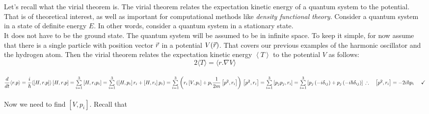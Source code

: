 \documentclass[fleqn]{article}
\begin{document}
\begin{enumerate}
\begin{enumerate}
      \textcolor{hwColor}{
        \\
        \\
        Let's recall what the vir­ial the­o­rem is. The vir­ial the­o­rem re­lates the ex­pec­ta­tion ki­netic en­ergy of a quan­tum sys­tem to the po­ten­tial. 
        That is of the­o­ret­i­cal in­ter­est, as well as im­por­tant for com­pu­ta­tional meth­ods like \emph{den­sity func­tional the­ory}.
        Con­sider a quan­tum sys­tem in a state of def­i­nite en­ergy $E$. In other words, con­sider a quan­tum sys­tem in a sta­tion­ary state. 
        \\
        It does not have to be the ground state. The quan­tum sys­tem will be as­sumed to be in in­fi­nite space. To keep it sim­ple, 
        for now as­sume that there is a sin­gle par­ti­cle with po­si­tion vec­tor ${\skew0\vec r}$ in a po­ten­tial $V({\skew0\vec r})$. 
        That cov­ers our pre­vi­ous ex­am­ples of the har­monic os­cil­la­tor and the hy­dro­gen atom.
        Then the vir­ial the­o­rem re­lates the ex­pec­ta­tion ki­netic en­ergy $\left\langle{T}\right\rangle $ to the po­ten­tial $V$ as fol­lows:
        $$2\langle T \rangle=\langle r.\nabla V\rangle$$
        \\
        $
          \dfrac{d}{dt} \langle r.p \rangle=\dfrac{i}{\hbar} \langle \left[H, r.p\right] \rangle
          \\
          \\
          \left[H, r.p\right]
          =\sum\limits_{i=1}^{3} \left[H, r_i p_i\right]
          =\sum\limits_{i=1}^{3} \left(\left[H, p_i\right]r_i+\left[H, r_i\right]p_i\right)
          =\sum\limits_{i=1}^{3} \left(
            r_i \left[V, p_i\right]+p_i \dfrac{1}{2m} \left[p^2, r_i\right]
          \right)
          \\
          \\
          \\
          \left[p^2, r_i\right]
          =\sum\limits_{i=1}^{3} \left[p_j p_j, r_i\right]
          =\sum\limits_{i=1}^{3} \left[p_j \left(-i \delta_{ij}\right)+p_j \left(-i \hbar \delta_{ij}\right)\right]
          \\
          \\
          \\
          \therefore ~~~ \left[p^2, r_i\right]=-2i \hbar p_i ~~~~ \checkmark
        $
        \\
        \\
        Now we need to find $\left[V, p_i\right]$. Recall that
        \\
}
\end{enumerate}
\end{enumerate}
\end{document}
